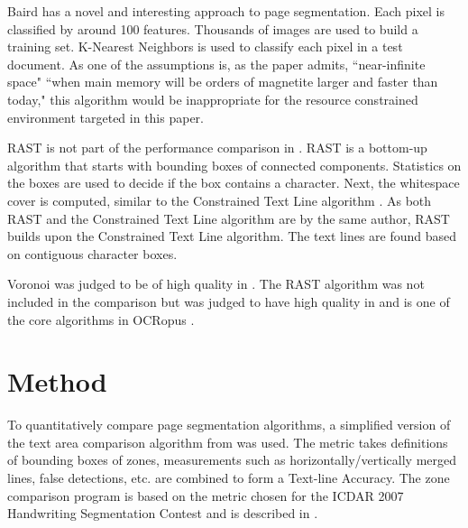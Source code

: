 \documentclass[conference]{IEEEtran}
\begin{document}
Baird \cite{baird2006versatile} has a novel and interesting approach to page
segmentation. Each pixel is classified by around 100 features. Thousands of
images are used to build a training set. K-Nearest Neighbors is used
to classify each pixel in a test document. As one of the assumptions
is, as the paper admits, ``near-infinite space" ``when main memory will
be orders of magnetite larger and faster than today," this algorithm
would be inappropriate for the resource constrained environment
targeted in this paper.

RAST is not part of the performance comparison in \cite{shafait2006performance,mao2000empirical}. 
RAST is a bottom-up algorithm that starts with bounding boxes of connected
components. Statistics on the boxes are used to decide if the box contains a
character. Next, the whitespace cover is computed, similar to the Constrained
Text Line algorithm \cite{breuel2002two}.  As both RAST and the Constrained
Text Line algorithm are by the same author, RAST builds upon the Constrained
Text Line algorithm. The text lines are found based on contiguous character
boxes.

Voronoi was judged to be of high quality in \cite{shafait2006performance}. The
RAST algorithm was not included in the \cite{shafait2006performance} comparison
but was judged to have high quality in \cite{winder2010extending} and is one of
the core algorithms in OCRopus \cite{breuel2008ocropus}. 


\section{Method}

To quantitatively compare page segmentation algorithms, a simplified version of
the text area comparison algorithm from \cite{phillips1999empirical} was used.
The metric takes definitions of bounding boxes of zones, measurements such as
horizontally/vertically merged lines, false detections, etc. are combined to
form a Text-line Accuracy.  The zone comparison program is based on the
metric chosen for the ICDAR 2007 Handwriting Segmentation Contest and is
described in \cite{antonacopoulos2007page}.

\end{document}
